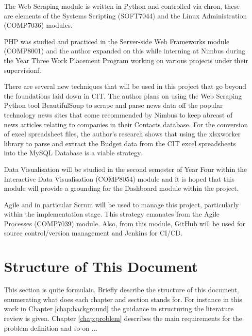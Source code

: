 The Web Scraping module is written in Python and controlled via chron, these are elements of the Systems Scripting (SOFT7044) and the Linux Administration (COMP7036) modules.

PHP was studied and practiced in the Server-side Web Frameworks module (COMP8001) and the author expanded on this while interning at Nimbus during the Year Three Work Placement Program working on various projects under their supervisionf.

There are several new techniques that will be used in this project that go beyond the foundations laid down in CIT. The author plans on using the Web Scraping Python tool BeautifulSoup to scrape and parse news data off the popular technology news sites that come recommended by Nimbus to keep abreast of news articles relating to companies in their Contacts database. For the conversion of excel spreadsheet files, the author’s research shows that using the xlsxworker library to parse and extract the Budget data from the CIT excel spreadsheets into the MySQL Database is a viable strategy.

Data Visualisation will be studied in the second semester of Year Four within the Interactive Data Visualisation (COMP8054) module and it is hoped that this module will provide a grounding for the Dashboard module within the project.

Agile and in particular Scrum will be used to manage this project, particularly within the implementation stage. This strategy emanates from the Agile Processes (COMP7039) module. Also, from this module,  GitHub will be used for source control/version management and Jenkins for CI/CD.

\section{Structure of This Document}
This section is quite formulaic. Briefly describe the structure of this document, enumerating what does each chapter and section stands for. For instance in this work in Chapter \ref{chap:background} the guidance in structuring the literature review is given. Chapter \ref{chap:problem} describes the main requirements for the problem definition and so on ...